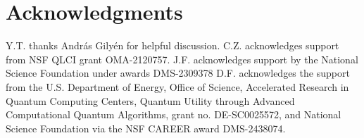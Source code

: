 \documentclass{article}
\theoremstyle{plain}
\theoremstyle{plain}
\theoremstyle{plain}
\theoremstyle{plain}
\theoremstyle{plain}
\theoremstyle{plain}
\theoremstyle{plain}
\begin{document}
\section*{Acknowledgments}
Y.T. thanks Andr{\'a}s Gily{\'e}n for helpful discussion.
C.Z. acknowledges support from NSF QLCI grant OMA-2120757.
J.F. acknowledges support by the National Science Foundation under awards DMS-2309378
D.F. acknowledges the support from the U.S. Department of Energy, Office of Science, Accelerated Research in Quantum Computing Centers, Quantum Utility through Advanced Computational Quantum Algorithms, grant no. DE-SC0025572, and National Science Foundation via the NSF CAREER award DMS-2438074. 



\end{document}
